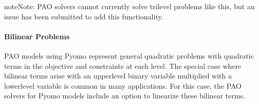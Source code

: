 \documentclass[letterpaper,10pt,english]{sphinxmanual}
\begin{document}
\begin{sphinxVerbatim}[commandchars=\\\{\}]
           
           
           
          
\end{sphinxVerbatim}

\begin{sphinxadmonition}{note}{Note:}
PAO solvers cannot currently solve trilevel problems like this,
but an issue has been submitted to add this functionality.
\end{sphinxadmonition}


\paragraph{Bilinear Problems}
\label{\detokenize{representations/pyomo:bilinear-problems}}
PAO models using Pyomo represent general quadratic problems with quadratic
terms in the objective and constraints at each level.  The special
case where bilinear terms arise with an upper\sphinxhyphen{}level binary variable
multiplied with a lower\sphinxhyphen{}level variable is common in many applications.
For this case, the PAO solvers for Pyomo models include an option to
linearize these bilinear terms.
\end{document}
